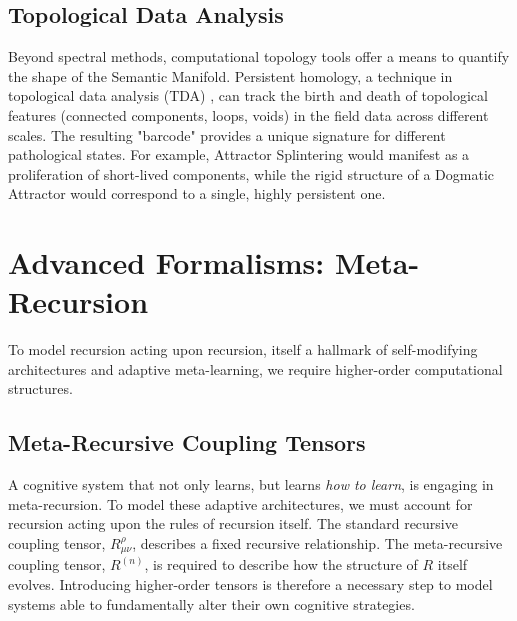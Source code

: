 
\subsection{Topological Data Analysis}
\label{17.3.4:topological_data_analysis}

Beyond spectral methods, computational topology tools offer a means to quantify the shape of the Semantic Manifold. Persistent homology, a technique in topological data analysis (TDA) \autocite{EdelsbrunnerHarer2010}, can track the birth and death of topological features (connected components, loops, voids) in the field data across different scales. The resulting "barcode" provides a unique signature for different pathological states. For example, Attractor Splintering would manifest as a proliferation of short-lived components, while the rigid structure of a Dogmatic Attractor would correspond to a single, highly persistent one.


\section{Advanced Formalisms: Meta-Recursion}
\label{17.4:advanced_formalisms_meta_recursion}

To model recursion acting upon recursion, itself a hallmark of self-modifying architectures and adaptive meta-learning, we require higher-order computational structures.


\subsection{Meta-Recursive Coupling Tensors}
\label{17.4.1:meta_recursive_coupling_tensors}

A cognitive system that not only learns, but learns \textit{how to learn}, is engaging in meta-recursion. To model these adaptive architectures, we must account for recursion acting upon the rules of recursion itself. The standard recursive coupling tensor, \(R^\rho_{\mu\nu}\), describes a fixed recursive relationship. The meta-recursive coupling tensor, \(R^{(n)}\), is required to describe how the structure of \(R\) itself evolves. Introducing higher-order tensors is therefore a necessary step to model systems able to fundamentally alter their own cognitive strategies.

